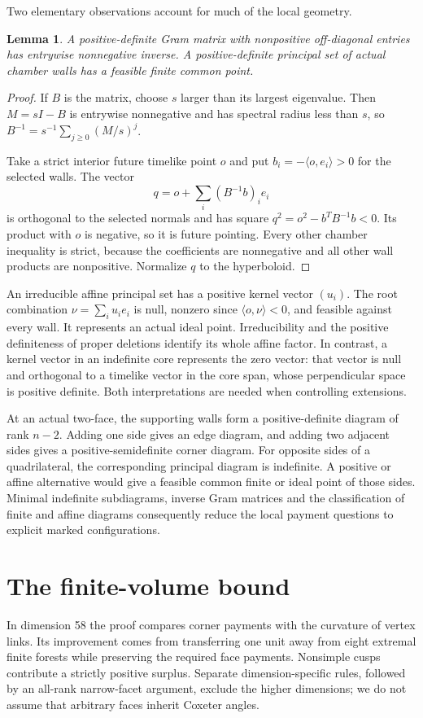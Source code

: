 \documentclass[11pt]{article}
\newtheorem{lemma}[theorem]{Lemma}
\theoremstyle{remark}\newtheorem{remark}[theorem]{Remark}
\numberwithin{equation}{section}
\newcommand{\ip}[2]{\langle #1,#2\rangle}
\begin{document}
Two elementary observations account for much of the local geometry.

\begin{lemma}\label{lem:positive}
A positive-definite Gram matrix with nonpositive off-diagonal entries
has entrywise nonnegative inverse. A positive-definite principal set
of actual chamber walls has a feasible finite common point.
\end{lemma}
\begin{proof}
If $B$ is the matrix, choose $s$ larger than its largest eigenvalue.
Then $M=sI-B$ is entrywise nonnegative and has spectral radius less
than $s$, so $B^{-1}=s^{-1}\sum_{j\ge0}(M/s)^j$.

Take a strict interior future timelike point $o$ and put
$b_i=-\ip{o}{e_i}>0$ for the selected walls. The vector
\[
 q=o+\sum_i(B^{-1}b)_i e_i
\]
is orthogonal to the selected normals and has square
$q^2=o^2-b^TB^{-1}b<0$. Its product with $o$ is negative, so it
is future pointing. Every other chamber inequality is strict,
because the coefficients are nonnegative and all other wall
products are nonpositive. Normalize $q$ to the hyperboloid.
\end{proof}

An irreducible affine principal set has a positive kernel vector
$(u_i)$. The root combination $\nu=\sum_i u_i e_i$ is null,
nonzero since $\ip{o}{\nu}<0$, and feasible against every wall.
It represents an actual ideal point. Irreducibility and the positive
definiteness of proper deletions identify its whole affine factor.
In contrast, a kernel vector in an indefinite core represents the
zero vector: that vector is null and orthogonal to a timelike
vector in the core span, whose perpendicular space is positive
definite. Both interpretations are needed when controlling extensions.

At an actual two-face, the supporting walls form a positive-definite
diagram of rank $n-2$. Adding one side gives an edge diagram, and
adding two adjacent sides gives a positive-semidefinite corner
diagram. For opposite sides of a quadrilateral, the corresponding
principal diagram is indefinite. A positive or affine alternative
would give a feasible common finite or ideal point of those sides.
Minimal indefinite subdiagrams, inverse Gram matrices and the
classification of finite and affine diagrams consequently reduce
the local payment questions to explicit marked configurations.


\section{The finite-volume bound}\label{sec:fv}
In dimension 58 the proof compares corner payments with the
curvature of vertex links. Its improvement comes from transferring
one unit away from eight extremal finite forests while preserving
the required face payments. Nonsimple cusps contribute a strictly
positive surplus. Separate dimension-specific rules, followed by
an all-rank narrow-facet argument, exclude the higher dimensions;
we do not assume that arbitrary faces inherit Coxeter angles.
\end{document}
